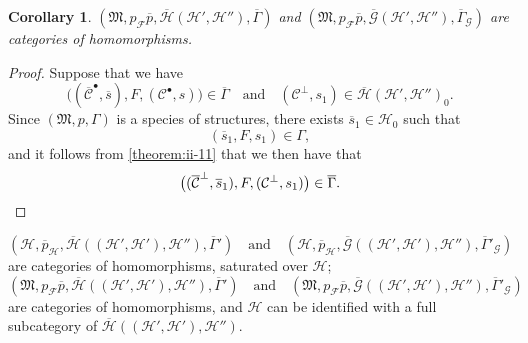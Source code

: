 \documentclass[a4paper,fleqn]{article}
\theoremstyle{plain}
\newenvironment{theorem}[1]
  {\renewcommand\theinnertheorem{#1}\innertheorem}
  {\endinnertheorem}
\newtheorem*{corollary*}{Corollary}
\theoremstyle{definition}
\newcommand{\oldpage}[1]{{\marginpar{\footnotesize$\bigg\vert$\,\,\,\,\textit{p.~#1}}}}
\newcommand{\textand}{\quad\text{and}\quad}
\newcommand{\CC}{\mathcal{C}}
\newcommand{\HH}{\mathcal{H}}
\newcommand{\MM}{\mathfrak{M}}
\newcommand{\FF}{\mathcal{F}}
\newcommand{\GG}{\mathcal{G}}
\begin{document}
\begin{corollary*}
  $(\MM,p_\FF\overline{p},\overline{\HH}(\HH',\HH''),\overline{\Gamma})$ and $(\MM,p_\FF\overline{p},\overline{\GG}(\HH',\HH''),\overline{\Gamma}_\GG)$ are categories of homomorphisms.
\end{corollary*}

\begin{proof}
  Suppose that we have
  \[
    \big((\overline{\CC}^\bullet,\overline{s}),F,(\CC^\bullet,s)\big)
    \in\overline{\Gamma}
    \textand
    (\CC^\perp,s_1)
    \in\overline{\HH}(\HH',\HH'')_0.
  \]
  Since $(\MM,p,\Gamma)$ is a species of structures, there exists $\overline{s}_1\in\HH_0$ such that
  \[
    (\overline{s}_1,F,s_1)
    \in\Gamma,
  \]
  and it follows from \cref{theorem:ii-11} that we then have that
  \[
    \big((\overline{\CC}^\perp,\overline{s}_1),F,(\CC^\perp,s_1)\big)
    \in\overline{\Gamma}.
    \qedhere
  \]
\end{proof}

\begin{theorem}{12}
\label{theorem:ii-12}
  \[
    (\HH,\overline{p}_\HH,\overline{\HH}((\HH',\HH'),\HH''),\overline{\Gamma}')
    \textand
    (\HH,\overline{p}_\HH,\overline{\GG}((\HH',\HH'),\HH''),\overline{\Gamma}'_\GG)
  \]
  are categories of homomorphisms, saturated over $\HH$;
  \oldpage{414}
  \[
    (\MM,p_\FF\overline{p},\overline{\HH}((\HH',\HH'),\HH''),\overline{\Gamma}')
    \textand
    (\MM,p_\FF\overline{p},\overline{\GG}((\HH',\HH'),\HH''),\overline{\Gamma}'_\GG)
  \]
  are categories of homomorphisms, and $\HH$ can be identified with a full subcategory of $\overline{\HH}((\HH',\HH'),\HH'')$.
\end{theorem}
\end{document}
